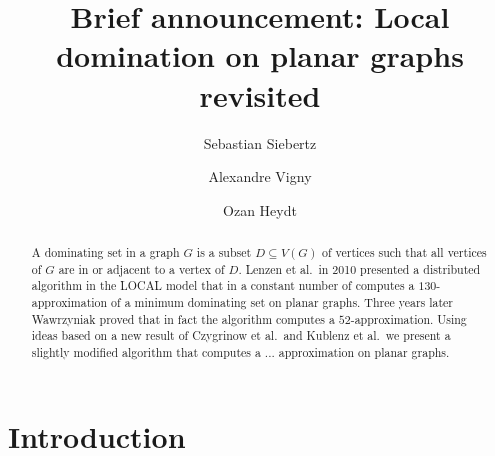 \documentclass[a4paper,UKenglish,cleveref, autoref, thm-restate]{lipics-v2021}
\title{Brief announcement: Local domination on planar graphs revisited} %
\author{Sebastian Siebertz}{University of Bremen, Germany}{siebertz@uni-bremen.de}{https://orcid.org/0000-0002-6347-1198}{}
\author{Alexandre Vigny}{University of Bremen, Germany}{vigny@uni-bremen.de}{https://orcid.org/0000-0002-4298-8876}{}
\author{Ozan Heydt}{University of Bremen, Germany}{heydt@uni-bremen.de}{}{}
\begin{document}
\maketitle

\begin{abstract}
A dominating set in a graph $G$ is a subset $D\subseteq V(G)$ of vertices
such that all vertices of $G$ are in or adjacent to a vertex of $D$. Lenzen et al.\
in 2010 presented a distributed algorithm in the LOCAL model that in a
constant number of computes
a $130$-approximation of a minimum dominating set on planar graphs.
Three years later Wawrzyniak proved that in fact the algorithm computes
a $52$-approximation. Using ideas based on a new result of Czygrinow et al.\
and Kublenz et al.\ we present a slightly modified algorithm that computes
a ... approximation on planar graphs.
\end{abstract}

\section{Introduction}
\end{document}
